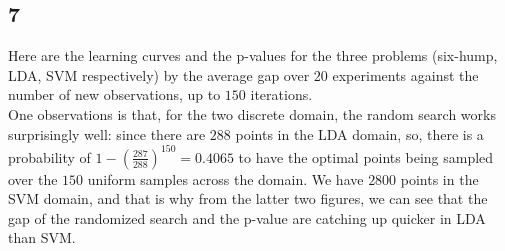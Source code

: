 \documentclass[12pt,a4paper]{article}
\begin{document}
\subsection*{7}
Here are the learning curves and the p-values for the three problems (six-hump, LDA, SVM respectively) by the average gap over $20$ experiments against the number of new observations, up to $150$ iterations. \\
One observations is that, for the two discrete domain, the random search works surprisingly well: since there are $288$ points in the LDA domain, so, there is a probability of $1-\left(\frac{287}{288}\right)^150=0.4065$ to have the optimal points being sampled over the $150$ uniform samples across the domain. We have $2800$ points in the SVM domain, and that is why from the latter two figures, we can see that the gap of the randomized search and the p-value are catching up quicker in LDA than SVM. 
\end{document}
